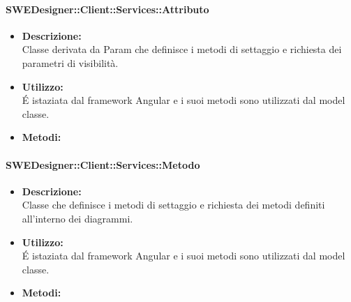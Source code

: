           	\paragraph{SWEDesigner::Client::Services::Attributo}
				\begin{itemize}
          			\item \textbf{Descrizione:}\\
          			Classe derivata da Param che definisce i metodi di settaggio e richiesta dei parametri di visibilità.
          			\item \textbf{Utilizzo:}\\
          			É istaziata dal framework Angular e i suoi metodi sono utilizzati dal model classe.
          			\item \textbf{Metodi:}\\
          		\end{itemize}
          	\paragraph{SWEDesigner::Client::Services::Metodo}
				\begin{itemize}
          			\item \textbf{Descrizione:}\\
          			Classe che definisce i metodi di settaggio e richiesta dei metodi definiti all’interno dei diagrammi.
          			\item \textbf{Utilizzo:}\\
          			É istaziata dal framework Angular e i suoi metodi sono utilizzati dal model classe.
          			\item \textbf{Metodi:}\\
          		\end{itemize}
